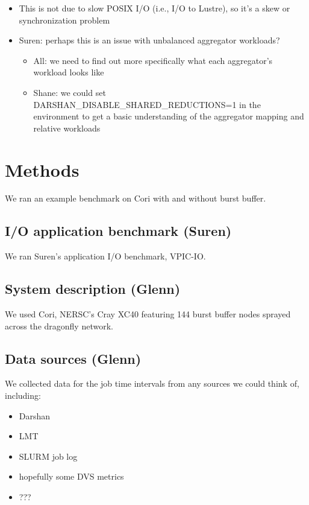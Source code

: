 \documentclass[conference,10pt,compsocconf]{IEEEtran}
\begin{document}
\begin{itemize}
\begin{itemize}
        \begin{itemize}
        \item This is not due to slow POSIX I/O (i.e., I/O to Lustre), so it's a skew or synchronization
              problem
        \item Suren: perhaps this is an issue with unbalanced aggregator workloads?
            \begin{itemize}
            \item All: we need to find out more specifically what each aggregator's workload looks like
            \item Shane: we could set DARSHAN\_DISABLE\_SHARED\_REDUCTIONS=1 in the environment to
                  get a basic understanding of the aggregator mapping and relative workloads
            \end{itemize}
        \end{itemize}
    \end{itemize}
\end{itemize}

\section{Methods}

We ran an example benchmark on Cori with and without burst buffer.

\subsection{I/O application benchmark (Suren)}

We ran Suren's application I/O benchmark, VPIC-IO.

\subsection{System description (Glenn)}

We used Cori, NERSC's Cray XC40 featuring 144 burst buffer nodes sprayed
across the dragonfly network.

\subsection{Data sources (Glenn)}

We collected data for the job time intervals from any sources we could think
of, including:

\begin{itemize}
\item Darshan~\cite{carns200924}
\item LMT
\item SLURM job log
\item hopefully some DVS metrics
\item ???
\end{itemize}
\end{document}
